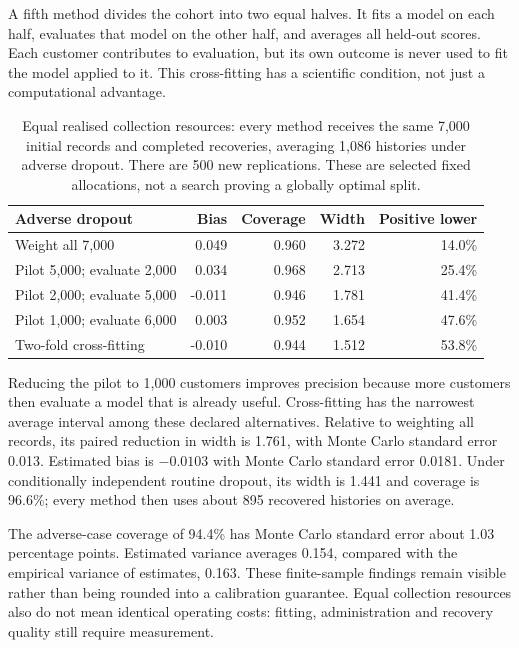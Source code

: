A fifth method divides the cohort into two equal halves. It fits a model
on each half, evaluates that model on the other half, and averages all
held-out scores. Each customer contributes to evaluation, but its own
outcome is never used to fit the model applied to it. This cross-fitting
has a scientific condition, not just a computational advantage.

\begin{table}[htbp]
\centering\small
\begin{tabular}{lrrrr}
\toprule
Adverse dropout & Bias & Coverage & Width & Positive lower\\
\midrule
Weight all 7,000 & 0.049 & 0.960 & 3.272 & 14.0\%\\
Pilot 5,000; evaluate 2,000 & 0.034 & 0.968 & 2.713 & 25.4\%\\
Pilot 2,000; evaluate 5,000 & -0.011 & 0.946 & 1.781 & 41.4\%\\
Pilot 1,000; evaluate 6,000 & 0.003 & 0.952 & 1.654 & 47.6\%\\
Two-fold cross-fitting & -0.010 & 0.944 & 1.512 & 53.8\%\\
\bottomrule
\end{tabular}
\caption{Equal realised collection resources: every method receives the same
7,000 initial records and completed recoveries, averaging 1,086 histories
under adverse dropout. There are 500 new replications. These are selected
fixed allocations, not a search proving a globally optimal split.}
\end{table}

Reducing the pilot to 1,000 customers improves precision because more
customers then evaluate a model that is already useful. Cross-fitting has
the narrowest average interval among these declared alternatives. Relative
to weighting all records, its paired reduction in width is 1.761, with
Monte Carlo standard error 0.013. Estimated bias is $-0.0103$ with Monte
Carlo standard error 0.0181. Under conditionally independent routine
dropout, its width is 1.441 and coverage is 96.6\%; every method then uses
about 895 recovered histories on average.

The adverse-case coverage of 94.4\% has Monte Carlo standard error about
1.03 percentage points. Estimated variance averages 0.154, compared with
the empirical variance of estimates, 0.163. These finite-sample findings
remain visible rather than being rounded into a calibration guarantee.
Equal collection resources also do not mean identical operating costs:
fitting, administration and recovery quality still require measurement.

